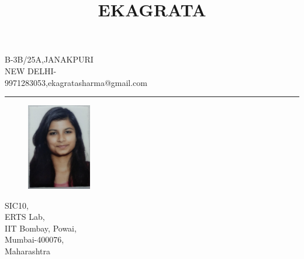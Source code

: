 \documentclass{article}
\date{}
\begin{document}
\title{EKAGRATA}
\maketitle
\vspace{-2cm}


\begin{center}

{\large B-3B/25A,JANAKPURI\\
NEW DELHI-\\
9971283053,ekagratasharma@gmail.com\\} 
\end{center}
\noindent\rule{15cm}{1pt}

\begin{figure}
    \centering
    \includegraphics[width=0.25\textwidth]{photo.jpg}
\end{figure}

SIC10,\\
ERTS Lab,\\
IIT Bombay, Powai,\\
Mumbai-400076,\\
Maharashtra
\end{document}
